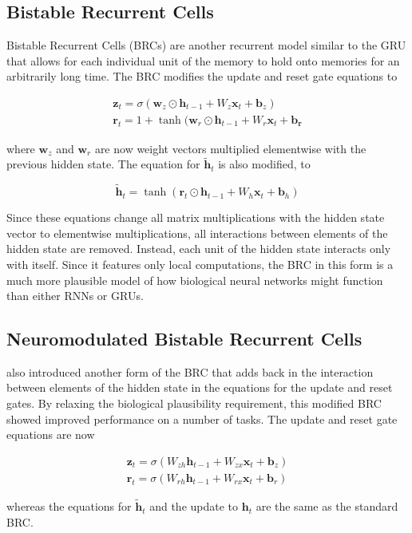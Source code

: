
\subsection*{Bistable Recurrent Cells}

Bistable Recurrent Cells (BRCs) \cite{vecoven2021brc} are another recurrent model similar to the GRU that allows for each individual unit of the memory to hold onto memories for an arbitrarily long time. The BRC modifies the update and reset gate equations to

\begin{gather*}
	\mathbf{z}_t = \sigma(\mathbf{w}_z \odot \mathbf{h}_{t-1} + W_z \mathbf{x}_t + \mathbf{b}_z)\\
	\mathbf{r}_t = 1 + \tanh(\mathbf{w}_r \odot \mathbf{h}_{t-1} + W_r \mathbf{x}_t + \mathbf{b_r}
\end{gather*}

where \(\mathbf{w}_z\) and \(\mathbf{w}_r\) are now weight vectors multiplied elementwise with the previous hidden state. The equation for \(\mathbf{\tilde{h}}_t\) is also modified, to

\[ \mathbf{\tilde{h}}_t = \tanh(\mathbf{r}_t \odot \mathbf{h}_{t-1} + W_h \mathbf{x}_t + \mathbf{b}_h) \]

Since these equations change all matrix multiplications with the hidden state vector to elementwise multiplications, all interactions between elements of the hidden state are removed. Instead, each unit of the hidden state interacts only with itself. Since it features only local computations, the BRC in this form is a much more plausible model of how biological neural networks might function than either RNNs or GRUs.




\subsection*{Neuromodulated Bistable Recurrent Cells}

\cite{vecoven2021brc} also introduced another form of the BRC that adds back in the interaction between elements of the hidden state in the equations for the update and reset gates. By relaxing the biological plausibility requirement, this modified BRC showed improved performance on a number of tasks. The update and reset gate equations are now

\begin{gather*}
	\mathbf{z}_t = \sigma(W_{zh} \mathbf{h}_{t-1} + W_{zx} \mathbf{x}_t + \mathbf{b}_z)\\
	\mathbf{r}_t = \sigma(W_{rh} \mathbf{h}_{t-1} + W_{rx} \mathbf{x}_t + \mathbf{b}_r)
\end{gather*}

whereas the equations for \(\mathbf{\tilde{h}}_t\) and the update to \(\mathbf{h}_t\) are the same as the standard BRC.